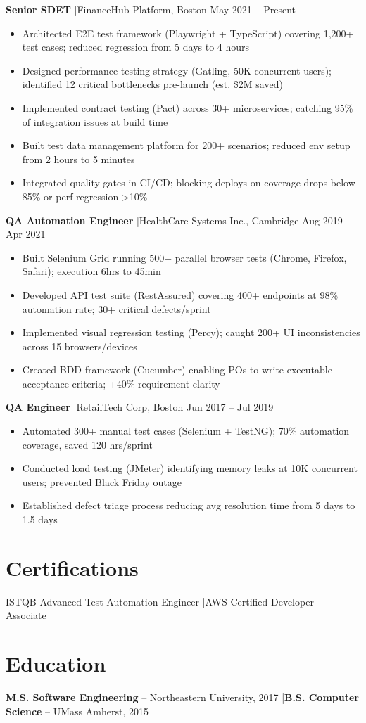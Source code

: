 \documentclass[10pt,a4paper]{article}
\begin{document}
\textbf{Senior SDET} \quad|\quad FinanceHub Platform, Boston \hfill May 2021 -- Present
\begin{itemize}
  \item Architected E2E test framework (Playwright + TypeScript) covering 1,200+ test cases; reduced regression from 5 days to 4 hours
  \item Designed performance testing strategy (Gatling, 50K concurrent users); identified 12 critical bottlenecks pre-launch (est. \$2M saved)
  \item Implemented contract testing (Pact) across 30+ microservices; catching 95\% of integration issues at build time
  \item Built test data management platform for 200+ scenarios; reduced env setup from 2 hours to 5 minutes
  \item Integrated quality gates in CI/CD; blocking deploys on coverage drops below 85\% or perf regression >10\%
\end{itemize}

\textbf{QA Automation Engineer} \quad|\quad HealthCare Systems Inc., Cambridge \hfill Aug 2019 -- Apr 2021
\begin{itemize}
  \item Built Selenium Grid running 500+ parallel browser tests (Chrome, Firefox, Safari); execution 6hrs to 45min
  \item Developed API test suite (RestAssured) covering 400+ endpoints at 98\% automation rate; 30+ critical defects/sprint
  \item Implemented visual regression testing (Percy); caught 200+ UI inconsistencies across 15 browsers/devices
  \item Created BDD framework (Cucumber) enabling POs to write executable acceptance criteria; +40\% requirement clarity
\end{itemize}

\textbf{QA Engineer} \quad|\quad RetailTech Corp, Boston \hfill Jun 2017 -- Jul 2019
\begin{itemize}
  \item Automated 300+ manual test cases (Selenium + TestNG); 70\% automation coverage, saved 120 hrs/sprint
  \item Conducted load testing (JMeter) identifying memory leaks at 10K concurrent users; prevented Black Friday outage
  \item Established defect triage process reducing avg resolution time from 5 days to 1.5 days
\end{itemize}

\section{Certifications}
ISTQB Advanced Test Automation Engineer \quad|\quad AWS Certified Developer -- Associate

\section{Education}
\textbf{M.S. Software Engineering} -- Northeastern University, 2017 \quad|\quad \textbf{B.S. Computer Science} -- UMass Amherst, 2015
\end{document}

